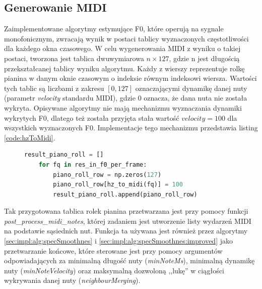 \documentclass[12pt,a4paper,twoside]{mwart}
\begin{document}
\subsection{Generowanie MIDI}\label{sec:impl:midiGen}
Zaimplementowane algorytmy estymujące F0, które operują na sygnale monofonicznym, zwracają wynik w postaci tablicy wyznaczonych częstotliwości dla każdego okna czasowego. W celu wygenerowania MIDI z wyniku o takiej postaci, tworzona jest tablica dwuwymiarowa $n \times 127$, gdzie n jest długością przekształcanej tablicy wyniku algorytmu. Każdy z wierszy reprezentuje rolkę pianina w danym oknie czasowym o indeksie równym indeksowi wiersza. Wartości tych tablic są liczbami z zakresu $\left[0, 127\right]$ oznaczającymi dynamikę danej nuty (parametr \textit{velocity} standardu MIDI), gdzie 0 oznacza, że dana nuta nie została wykryta. Opisywane algorytmy nie mają mechanizmu wyznaczania dynamiki wykrytych F0, dlatego też została przyjęta stała wartość $velocity = 100$ dla wszystkich wyznaczonych F0. Implementacje tego mechanizmu przedstawia listing \ref{code:hzToMidi}.
\begin{figure}[t]
\begin{lstlisting}[language=Python, caption={Funkcja tranformująca wynik detekcji F0 do postaci rolki pianina dla sygnału monofonicznego.}, captionpos=b, label={code:hzToMidi}, numbers=none]
	result_piano_roll = []
	for fq in res_in_f0_per_frame:
		piano_roll_row = np.zeros(127)
		piano_roll_row[hz_to_midi(fq)] = 100
		result_piano_roll.append(piano_roll_row)
\end{lstlisting}
\end{figure}

Tak przygotowana tablica rolek pianina przetwarzana jest przy pomocy funkcji \\\mbox{\textit{post\_process\_midi\_notes}}, której zadaniem jest utworzenie listy wydarzeń MIDI na podstawie sąsiednich nut. Funkcja ta używana jest również przez algorytmy \ref{sec:impl:alg:specSmoothnes} i \ref{sec:impl:alg:specSmoothnes:improved} jako przetwarzanie końcowe, które sterowane jest przy pomocy argumentów odpowiadających za minimalną długość nuty (\textit{minNoteMs}), minimalną dynamikę nuty (\textit{minNoteVelocity}) oraz maksymalną dozwoloną ,,lukę'' w ciągłości wykrywania danej nuty (\textit{neighbourMerging}).
\end{document}
